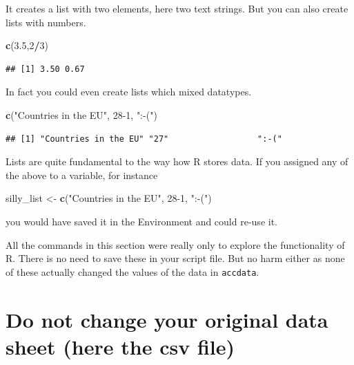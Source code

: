 \documentclass[
]{article}
\newenvironment{Shaded}{\begin{snugshade}}{\end{snugshade}}
\newcommand{\DecValTok}[1]{\textcolor[rgb]{0.00,0.00,0.81}{#1}}
\newcommand{\FloatTok}[1]{\textcolor[rgb]{0.00,0.00,0.81}{#1}}
\newcommand{\FunctionTok}[1]{\textcolor[rgb]{0.13,0.29,0.53}{\textbf{#1}}}
\newcommand{\NormalTok}[1]{#1}
\newcommand{\OtherTok}[1]{\textcolor[rgb]{0.56,0.35,0.01}{#1}}
\newcommand{\SpecialCharTok}[1]{\textcolor[rgb]{0.81,0.36,0.00}{\textbf{#1}}}
\newcommand{\StringTok}[1]{\textcolor[rgb]{0.31,0.60,0.02}{#1}}
\begin{document}
It creates a list with two elements, here two text strings. But you can
also create lists with numbers.

\begin{Shaded}
\begin{Highlighting}[]
\FunctionTok{c}\NormalTok{(}\FloatTok{3.5}\NormalTok{,}\DecValTok{2}\SpecialCharTok{/}\DecValTok{3}\NormalTok{)}
\end{Highlighting}
\end{Shaded}

\begin{verbatim}
## [1] 3.50 0.67
\end{verbatim}

In fact you could even create lists which mixed datatypes.

\begin{Shaded}
\begin{Highlighting}[]
\FunctionTok{c}\NormalTok{(}\StringTok{"Countries in the EU"}\NormalTok{, }\DecValTok{28{-}1}\NormalTok{, }\StringTok{":{-}("}\NormalTok{)}
\end{Highlighting}
\end{Shaded}

\begin{verbatim}
## [1] "Countries in the EU" "27"                  ":-("
\end{verbatim}

Lists are quite fundamental to the way how R stores data. If you
assigned any of the above to a variable, for instance

\begin{Shaded}
\begin{Highlighting}[]
\NormalTok{silly\_list }\OtherTok{\textless{}{-}} \FunctionTok{c}\NormalTok{(}\StringTok{"Countries in the EU"}\NormalTok{, }\DecValTok{28{-}1}\NormalTok{, }\StringTok{":{-}("}\NormalTok{)}
\end{Highlighting}
\end{Shaded}

you would have saved it in the Environment and could re-use it.

All the commands in this section were really only to explore the
functionality of R. There is no need to save these in your script file.
But no harm either as none of these actually changed the values of the
data in \texttt{accdata}.

\hypertarget{do-not-change-your-original-data-sheet-here-the-csv-file}{%
\section{Do not change your original data sheet (here the csv
file)}\label{do-not-change-your-original-data-sheet-here-the-csv-file}}
\end{document}
